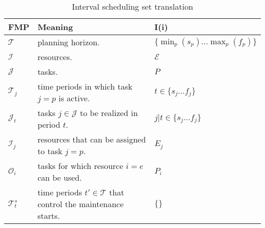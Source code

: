 \documentclass[a4paper,11pt]{article}
\begin{document}
    \begin{table}
        \begin{tabular}{l|l|l}
        	\textbf{FMP}        &  \textbf{Meaning} & \textbf{I(i)} \\ \hline
            $\mathcal{T}$       &  planning horizon. & $\{\min_p({s_p}) ... \max_p({f_p})\}$ \\
            $\mathcal{I}$       &  resources. & $ \mathcal{E}$ \\
            $\mathcal{J}$       &  tasks.  & $ P$ \\
            $\mathcal{T}_j$     &  time periods in which task $j=p$ is active. & $t \in \{s_j ... f_j\}$ \\
            $\mathcal{J}_t$     &  tasks $j \in \mathcal{J}$ to be realized in period $t$. & $j | t \in \{s_j ... f_j\}$ \\
            $\mathcal{I}_j$     &  resources that can be assigned to task $j=p$. & $E_j$\\
            $\mathcal{O}_i$     &  tasks for which resource $i=e$ can be used. & $P_i$ \\
            $\mathcal{T}^{s}_t$ &  time periods $t' \in \mathcal{T}$ that control the maintenance starts. & $\{\}$ \\
        \end{tabular}
        \caption{Interval scheduling set translation}
        \label{tab:sets_inter}
    \end{table}


    \vskip 0.3cm
\end{document}
